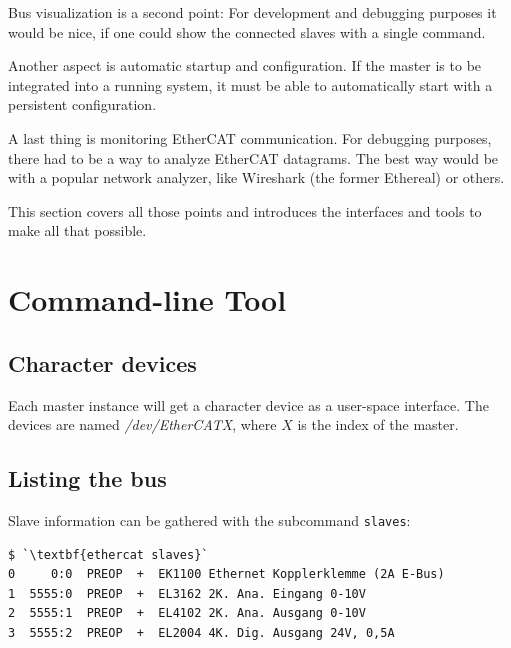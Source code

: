 \documentclass[a4paper,12pt,BCOR6mm,bibtotoc,idxtotoc]{scrbook}
\begin{document}
Bus visualization is a second point: For development and debugging
purposes it would be nice, if one could show the connected slaves with
a single command.

Another aspect is automatic startup and configuration. If the master
is to be integrated into a running system, it must be able to
automatically start with a persistent configuration.

A last thing is monitoring EtherCAT communication. For debugging
purposes, there had to be a way to analyze EtherCAT datagrams. The
best way would be with a popular network analyzer, like Wireshark
\cite{wireshark} (the former Ethereal) or others.

This section covers all those points and introduces the interfaces and
tools to make all that possible.


\section{Command-line Tool}
\label{sec:ethercat}


\subsection{Character devices}
\label{sec:cdev}

Each master instance will get a character device as a user-space interface.
The devices are named \textit{/dev/EtherCATX}, where $X$ is the index of the
master.



\subsection{Listing the bus}

Slave information can be gathered with the subcommand \lstinline+slaves+:

\begin{lstlisting}
$ `\textbf{ethercat slaves}`
0     0:0  PREOP  +  EK1100 Ethernet Kopplerklemme (2A E-Bus)
1  5555:0  PREOP  +  EL3162 2K. Ana. Eingang 0-10V
2  5555:1  PREOP  +  EL4102 2K. Ana. Ausgang 0-10V
3  5555:2  PREOP  +  EL2004 4K. Dig. Ausgang 24V, 0,5A
\end{lstlisting}
\end{document}
